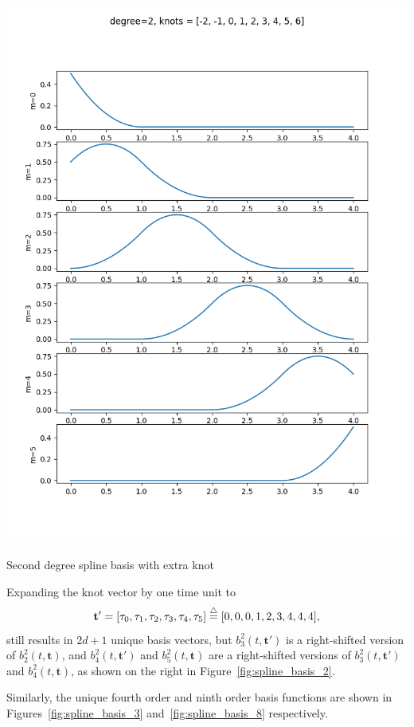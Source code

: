 \begin{marginfigure}[-2.5in]
  	\includegraphics[width=\linewidth]{./chap5_trajectory_planning/figures/spline_basis_2_extra_knot}
  \caption{Second degree spline basis with extra knot}
  \label{fig:spline_basis_2}  
\end{marginfigure}
Expanding the knot vector by one time unit to 
\[
\mathbf{t}' = [\tau_0, \tau_1, \tau_2, \tau_3, \tau_4, \tau_5] \stackrel{\triangle}{=} [0, 0, 0, 1, 2, 3, 4, 4, 4],
\]
still results in $2d+1$ unique basis vectors, but $b_3^2(t,  \mathbf{t}')$ is a right-shifted version of $b_2^2(t,  \mathbf{t})$, and $b_4^2(t,  \mathbf{t}')$ and $b_5^2(t,  \mathbf{t})$ are a right-shifted versions of $b_3^2(t,  \mathbf{t}')$ and $b_4^2(t,  \mathbf{t})$, as shown on the right in Figure~\ref{fig:spline_basis_2}.

Similarly, the unique fourth order and ninth order basis functions are shown in Figures~\ref{fig:spline_basis_3} and~\ref{fig:spline_basis_8} respectively.

